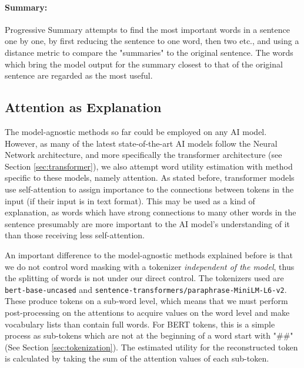 \paragraph{Summary:}
Progressive Summary attempts to find the most important words in a sentence one by one, by first reducing the sentence to one word, then two etc., and using a distance metric to compare the "summaries" to the original sentence.
The words which bring the model output for the summary closest to that of the original sentence are regarded as the most useful.

\subsection{Attention as Explanation}
The model-agnostic methods so far could be employed on any AI model.
However, as many of the latest state-of-the-art AI models follow the Neural Network architecture, and more specifically the transformer architecture (see Section \ref{sec:transformer}), we also attempt word utility estimation with method specific to these models, namely attention.
As stated before, transformer models use self-attention to assign importance to the connections between tokens in the input (if their input is in text format).
This may be used as a kind of explanation, as words which have strong connections to many other words in the sentence presumably are more important to the AI model's understanding of it than those receiving less self-attention.

An important difference to the model-agnostic methods explained before is that we do not control word masking with a tokenizer \textit{independent of the model}, thus the splitting of words is not under our direct control.
The tokenizers used are \texttt{bert-base-uncased} and \texttt{sentence-transformers/paraphrase-MiniLM-L6-v2}.
These produce tokens on a sub-word level, which means that we must perform post-processing on the attentions to acquire values on the word level and make vocabulary lists than contain full words.
For BERT tokens, this is a simple process as sub-tokens which are not at the beginning of a word start with "\#\#" (See Section \ref{sec:tokenization}).
The estimated utility for the reconstructed token is calculated by taking the sum of the attention values of each sub-token.

